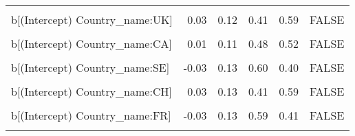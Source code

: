 \begin{table}
\begin{tabular}[t]{lrrrrl}
\cellcolor{gray!10}{b[EPS Country\_name:NL]} & \cellcolor{gray!10}{0.07} & \cellcolor{gray!10}{0.05} & \cellcolor{gray!10}{0.08} & \cellcolor{gray!10}{0.92} & \cellcolor{gray!10}{FALSE}\\
b[(Intercept) Country\_name:UK] & 0.03 & 0.12 & 0.41 & 0.59 & FALSE\\
\cellcolor{gray!10}{b[EPS Country\_name:UK]} & \cellcolor{gray!10}{0.04} & \cellcolor{gray!10}{0.05} & \cellcolor{gray!10}{0.17} & \cellcolor{gray!10}{0.83} & \cellcolor{gray!10}{FALSE}\\
b[(Intercept) Country\_name:CA] & 0.01 & 0.11 & 0.48 & 0.52 & FALSE\\
\cellcolor{gray!10}{b[EPS Country\_name:CA]} & \cellcolor{gray!10}{0.01} & \cellcolor{gray!10}{0.05} & \cellcolor{gray!10}{0.41} & \cellcolor{gray!10}{0.59} & \cellcolor{gray!10}{FALSE}\\
b[(Intercept) Country\_name:SE] & -0.03 & 0.13 & 0.60 & 0.40 & FALSE\\
\cellcolor{gray!10}{b[EPS Country\_name:SE]} & \cellcolor{gray!10}{-0.06} & \cellcolor{gray!10}{0.05} & \cellcolor{gray!10}{0.89} & \cellcolor{gray!10}{0.11} & \cellcolor{gray!10}{FALSE}\\
b[(Intercept) Country\_name:CH] & 0.03 & 0.13 & 0.41 & 0.59 & FALSE\\
\cellcolor{gray!10}{b[EPS Country\_name:CH]} & \cellcolor{gray!10}{0.04} & \cellcolor{gray!10}{0.05} & \cellcolor{gray!10}{0.17} & \cellcolor{gray!10}{0.83} & \cellcolor{gray!10}{FALSE}\\
b[(Intercept) Country\_name:FR] & -0.03 & 0.13 & 0.59 & 0.41 & FALSE\\
\cellcolor{gray!10}{b[EPS Country\_name:FR]} & \cellcolor{gray!10}{-0.06} & \cellcolor{gray!10}{0.05} & \cellcolor{gray!10}{0.89} & \cellcolor{gray!10}{0.11} & \cellcolor{gray!10}{FALSE}\\
\bottomrule
\end{tabular}
\end{table}

